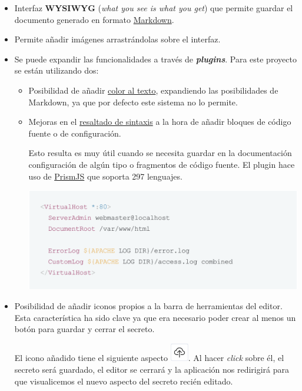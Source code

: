 \documentclass{\ClassPath/viu-tfm-template}
\begin{document}
\begin{itemize}
    \item Interfaz \textbf{WYSIWYG} (\textit{what you see is what you get}) que permite guardar el documento generado en formato \href{https://es.wikipedia.org/wiki/Markdown}{Markdown}.
    \item Permite añadir imágenes arrastrándolas sobre el interfaz.
    \item Se puede expandir las funcionalidades a través de \textit{\textbf{plugins}}. Para este proyecto se están utilizando dos:
    \begin{itemize}
        \item Posibilidad de añadir \href{https://github.com/nhn/tui.editor/tree/master/plugins/color-syntax}{color al texto}, expandiendo las posibilidades de Markdown, ya que por defecto este sistema no lo permite.
        \item Mejoras en el \href{https://github.com/nhn/tui.editor/tree/master/plugins/color-syntax}{resaltado de sintaxis} a la hora de añadir bloques de código fuente o de configuración.

        Esto resulta es muy útil cuando se necesita guardar en la documentación configuración de algún tipo o fragmentos de código fuente. El plugin hace uso de \href{https://prismjs.com/}{PrismJS} que soporta 297 lenguajes.
        \begin{center}
            \includegraphics[frame,width=0.7\linewidth]{img/editor_example.png}
        \end{center}
    \end{itemize}

    \item Posibilidad de añadir iconos propios a la barra de herramientas del editor. Esta característica ha sido clave ya que era necesario poder crear al menos un botón para guardar y cerrar el secreto.

    El icono añadido tiene el siguiente aspecto \includegraphics[width=0.8cm]{img/save_exit.png}. Al hacer \textit{click} sobre él, el secreto será guardado, el editor se cerrará y la aplicación nos redirigirá para que visualicemos el nuevo aspecto del secreto recién editado.
\end{itemize}
\end{document}
